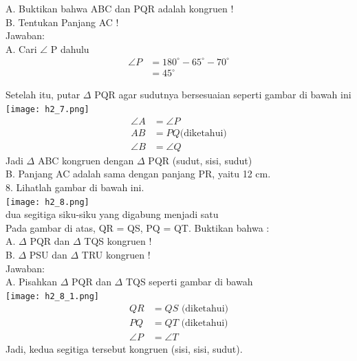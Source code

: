 \documentclass[11pt,fleqn]{book} %
\begin{document}
A. Buktikan bahwa  ABC dan  PQR adalah kongruen !\\
B. Tentukan Panjang AC !\\

Jawaban:\\
A. Cari $\angle$ P dahulu\\
    \begin{align*}              \angle P &= 180^{\circ} - 65^{\circ} - 70^{\circ} \\                      &= 45^{\circ}       \end{align*}

Setelah itu, putar $\Delta$ PQR agar sudutnya bersesuaian seperti gambar di bawah ini\\
\texttt{[image: h2\_7.png]}\\
    \begin{align*}  	    \angle A &= \angle P \\  		AB &= PQ \text{(diketahui)} \\  		\angle B &= \angle Q   	  \end{align*}
Jadi $\Delta$ ABC kongruen dengan $\Delta$ PQR (sudut, sisi, sudut)\\

B. Panjang AC adalah sama dengan panjang PR, yaitu 12 cm.\\


8. Lihatlah gambar di bawah ini.\\
\texttt{[image: h2\_8.png]}\\
dua segitiga siku-siku yang digabung menjadi satu\\
Pada gambar di atas, QR = QS, PQ = QT. Buktikan bahwa :\\

A. $\Delta$ PQR dan $\Delta$ TQS kongruen !\\
B. $\Delta$ PSU dan $\Delta$ TRU kongruen !\\

Jawaban:\\
A. Pisahkan $\Delta$ PQR dan $\Delta$ TQS seperti gambar di bawah\\
\texttt{[image: h2\_8\_1.png]}\\
    \begin{align*}  	        QR &= QS \text{ (diketahui)}\\  		PQ &= QT \text{ (diketahui)} \\  		\angle P &= \angle T   	     \end{align*}
Jadi, kedua segitiga tersebut kongruen (sisi, sisi, sudut).\\
\end{document}
